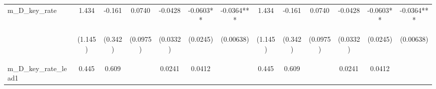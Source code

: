 \documentclass[]{article}
\begin{document}
\begin{center}
\begin{tabular}{lcccccccccccc}
m\_D\_key\_rate & 1.434 & -0.161 & 0.0740 & -0.0428 & -0.0603** & -0.0364*** & 1.434 & -0.161 & 0.0740 & -0.0428 & -0.0603** & -0.0364*** \\
\vspace{4pt} & \begin{footnotesize}(1.145)\end{footnotesize} & \begin{footnotesize}(0.342)\end{footnotesize} & \begin{footnotesize}(0.0975)\end{footnotesize} & \begin{footnotesize}(0.0332)\end{footnotesize} & \begin{footnotesize}(0.0245)\end{footnotesize} & \begin{footnotesize}(0.00638)\end{footnotesize} & \begin{footnotesize}(1.145)\end{footnotesize} & \begin{footnotesize}(0.342)\end{footnotesize} & \begin{footnotesize}(0.0975)\end{footnotesize} & \begin{footnotesize}(0.0332)\end{footnotesize} & \begin{footnotesize}(0.0245)\end{footnotesize} & \begin{footnotesize}(0.00638)\end{footnotesize} \\
m\_D\_key\_rate\_lead1 & 0.445 & 0.609 &  & 0.0241 & 0.0412 &  & 0.445 & 0.609 &  & 0.0241 & 0.0412 &  \\

\end{tabular}
\end{center}
\end{document}
